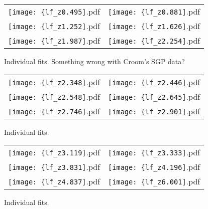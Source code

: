 \documentclass[a4paper,fleqn,usenatbib]{mnras}
\begin{document}
\begin{figure*}
  \begin{center}
    \begin{tabular}{cc}
      \texttt{[image: \{lf\_z0.495]}.pdf} &
      \texttt{[image: \{lf\_z0.881]}.pdf} \\
      
      \texttt{[image: \{lf\_z1.252]}.pdf} &
      \texttt{[image: \{lf\_z1.626]}.pdf} \\
      
      \texttt{[image: \{lf\_z1.987]}.pdf} &
      \texttt{[image: \{lf\_z2.254]}.pdf} \\
    \end{tabular}
  \end{center}
  \caption{Individual fits.  Something wrong with Croom's SGP data?}
\end{figure*}

\begin{figure*}
  \begin{center}
    \begin{tabular}{cc}
      \texttt{[image: \{lf\_z2.348]}.pdf} &
      \texttt{[image: \{lf\_z2.446]}.pdf} \\
      
      \texttt{[image: \{lf\_z2.548]}.pdf} &
      \texttt{[image: \{lf\_z2.645]}.pdf} \\
      
      \texttt{[image: \{lf\_z2.746]}.pdf} &
      \texttt{[image: \{lf\_z2.901]}.pdf} \\
    \end{tabular}
  \end{center}
  \caption{Individual fits.}
\end{figure*}

\begin{figure*}
  \begin{center}
    \begin{tabular}{cc}
      \texttt{[image: \{lf\_z3.119]}.pdf} &
      \texttt{[image: \{lf\_z3.333]}.pdf} \\
      
      \texttt{[image: \{lf\_z3.831]}.pdf} &
      \texttt{[image: \{lf\_z4.196]}.pdf} \\
      
      \texttt{[image: \{lf\_z4.837]}.pdf} &
      \texttt{[image: \{lf\_z6.001]}.pdf} \\
    \end{tabular}
  \end{center}
  \caption{Individual fits.}
\end{figure*}
\end{document}
